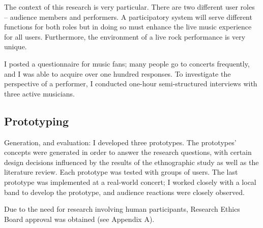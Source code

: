 The context of this research is very particular. There are two different user roles -- audience members and performers. A participatory system will serve different functions for both roles but in doing so must enhance the live music experience for all users. Furthermore, the environment of a live rock performance is very unique.

I posted a questionnaire for music fans; many people go to concerts frequently, and I was able to acquire over one hundred responses. To investigate the perspective of a performer, I conducted one-hour semi-structured interviews with three active musicians.

\subsection{Prototyping}
Generation, and evaluation: I developed three prototypes. The prototypes' concepts were generated in order to answer the research questions, with certain design decisions influenced by the results of the ethnographic study as well as the literature review. Each prototype was tested with groups of users. The last prototype was implemented at a real-world concert; I worked closely with a local band to develop the prototype, and audience reactions were closely observed.

Due to the need for research involving human participants, Research Ethics Board approval was obtained (see Appendix A).